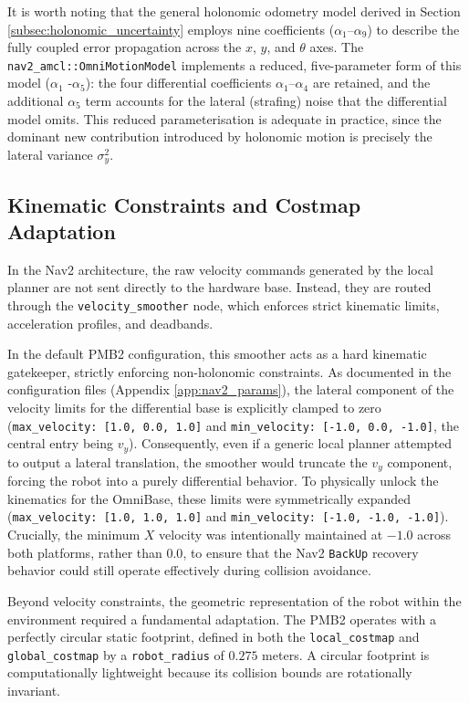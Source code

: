 It is worth noting that the general holonomic odometry model derived in Section \ref{subsec:holonomic_uncertainty} employs nine coefficients ($\alpha_1$--$\alpha_9$) to describe the fully coupled error propagation across the $x$, $y$, and $\theta$ axes. The \texttt{nav2\_amcl::OmniMotionModel} implements a reduced, five-parameter form of this model ($\alpha_1$ -$\alpha_5$): the four differential coefficients $\alpha_1$--$\alpha_4$ are retained, and the additional $\alpha_5$ term accounts for the lateral (strafing) noise that the differential model omits. This reduced parameterisation is adequate in practice, since the dominant new contribution introduced by holonomic motion is precisely the lateral variance $\sigma_y^2$.

\subsection{Kinematic Constraints and Costmap Adaptation}
\label{subsec:costmap_tuning}

In the Nav2 architecture, the raw velocity commands generated by the local planner are not sent directly to the hardware base. Instead, they are routed through the \texttt{velocity\_smoother} node, which enforces strict kinematic limits, acceleration profiles, and deadbands. 

In the default PMB2 configuration, this smoother acts as a hard kinematic gatekeeper, strictly enforcing non-holonomic constraints. As documented in the configuration files (Appendix \ref{app:nav2_params}), the lateral component of the velocity limits for the differential base is explicitly clamped to zero (\texttt{max\_velocity: [1.0, 0.0, 1.0]} and \texttt{min\_velocity: [-1.0, 0.0, -1.0]}, the central entry being $v_y$). Consequently, even if a generic local planner attempted to output a lateral translation, the smoother would truncate the $v_y$ component, forcing the robot into a purely differential behavior. To physically unlock the kinematics for the OmniBase, these limits were symmetrically expanded (\texttt{max\_velocity: [1.0, 1.0, 1.0]} and \texttt{min\_velocity: [-1.0, -1.0, -1.0]}). Crucially, the minimum $X$ velocity was intentionally maintained at $-1.0$ across both platforms, rather than $0.0$, to ensure that the Nav2 \texttt{BackUp} recovery behavior could still operate effectively during collision avoidance.

Beyond velocity constraints, the geometric representation of the robot within the environment required a fundamental adaptation. The PMB2 operates with a perfectly circular static footprint, defined in both the \texttt{local\_costmap} and \texttt{global\_costmap} by a \texttt{robot\_radius} of $0.275$ meters. A circular footprint is computationally lightweight because its collision bounds are rotationally invariant. 

